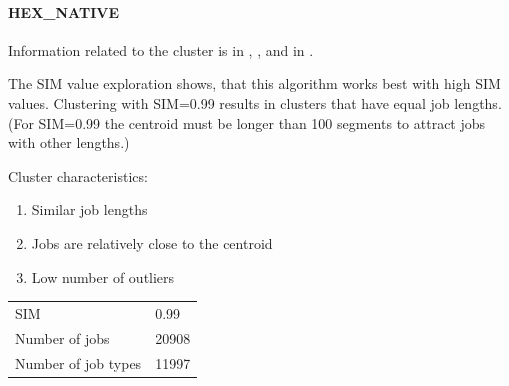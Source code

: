 \documentclass[]{llncs}
\begin{document}
\paragraph{HEX\_NATIVE}
Information related to the cluster is in , , and in .

The SIM value exploration shows, that this algorithm works best with high SIM values.
Clustering with SIM=0.99 results in clusters that have equal job lengths.
(For SIM=0.99 the centroid must be longer than 100 segments to attract jobs with other lengths.) 

Cluster characteristics:

\begin{enumerate}
 \item Similar job lengths
 \item Jobs are relatively close to the centroid
 \item Low number of outliers
\end{enumerate}

\begingroup
  \centering
  \begin{tabular}{ll}
    SIM & 0.99 \\
    Number of jobs & 20908 \\
    Number of job types & 11997 \\
  \end{tabular}
  \label{tab:hex_native:stats}
\endgroup
\end{document}
